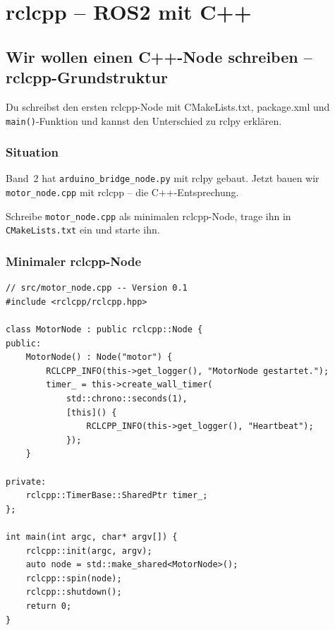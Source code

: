 
\part{rclcpp -- ROS2 mit C++}

\chapter{Wir wollen einen C++-Node schreiben –
  rclcpp-Grundstruktur}

\begin{lernziele}
Du schreibst den ersten rclcpp-Node mit CMakeLists.txt,
package.xml und \texttt{main()}-Funktion
und kannst den Unterschied zu rclpy erklären.
\end{lernziele}

\section{Situation}

Band~2 hat \texttt{arduino\_bridge\_node.py} mit rclpy gebaut.
Jetzt bauen wir \texttt{motor\_node.cpp} mit rclcpp --
die C++-Entsprechung.

\begin{aufgabeBox}
Schreibe \texttt{motor\_node.cpp} als minimalen rclcpp-Node,
trage ihn in \texttt{CMakeLists.txt} ein und starte ihn.
\end{aufgabeBox}

\section{Minimaler rclcpp-Node}

\begin{lstlisting}[style=cpp]
// src/motor_node.cpp -- Version 0.1
#include <rclcpp/rclcpp.hpp>

class MotorNode : public rclcpp::Node {
public:
    MotorNode() : Node("motor") {
        RCLCPP_INFO(this->get_logger(), "MotorNode gestartet.");
        timer_ = this->create_wall_timer(
            std::chrono::seconds(1),
            [this]() {
                RCLCPP_INFO(this->get_logger(), "Heartbeat");
            });
    }

private:
    rclcpp::TimerBase::SharedPtr timer_;
};

int main(int argc, char* argv[]) {
    rclcpp::init(argc, argv);
    auto node = std::make_shared<MotorNode>();
    rclcpp::spin(node);
    rclcpp::shutdown();
    return 0;
}
\end{lstlisting}

